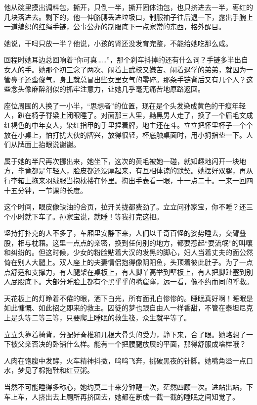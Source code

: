 \documentclass[lang=cn,newtx,12pt,scheme=chinese]{elegantbook}
\begin{document}
他从碗里摸出调料包，撕开，只倒一半，撕开固体油包，也只挤进去一半，枣红的几块落进去。剩下的，他一伸胳膊丢进垃圾口，制服袖子往后退一下，露出手腕上一道编织的红绳手链，公事公办的制服底下一点家常的东西，格外醒目。

她说，干吗只放一半？他说，小孩的肾还没发育完整，不能给她吃那么咸。

回程时她耳边总回响着“你可真……”，那个刹车抖掉的还有什么词？手链多半出自女人的手。她那个初三念了两次、闹着上武校又嫌苦、闹着退学的弟弟，就因为一管鼻子还蛮俊气，身上就总冒出些女里女气的零碎。那条手链背后又有几个人？这些念头像麻醉剂似的抓牢注意力，让她几乎毫无痛苦地原路返回。

座位周围的人换了一小半，“思想者”的位置，现在是个头发染成黄色的干瘦年轻人，趴在椅子脊梁上闭眼睡了。对面那三人里，黝黑男人走了，换了一个眉毛文成红褐色的中年女人，染红指甲的手里捏着牌，地主还在斗。立立把怀里杯子一个个放在小桌上，怕打扰大伙的牌兴，放得很轻，杯底触桌面时，用小拇指垫一下。人们从牌面上抬眼说谢谢。

属于她的半尺再次挪出来，她坐下，这次的黄毛被她一碰，就知趣地闪开一块地方，毕竟都是年轻人，脸皮都还没厚起来，有互相体谅的默契。她摆好双腿，再从行李箱上拖来羽绒服当抱枕搂在怀里。掏出手表看一眼，十一点二十。一来一回四十五分钟，一节课的长度。

这个时间，眼皮像缺油的合页，拉开关拢都费劲了。立立问孙家宝，你不睡？还三个小时就下车了。孙家宝说，就睡！等我打完这把。

坚持打扑克的人不多了，车厢里安静下来，人们以千奇百怪的姿势睡去，交臂叠股，相与枕藉。这里一点点的亲密，换到任何别的地方，都要惹起“耍流氓”的叫嚷和纠纷的。但这时候，少女的粉脸贴着大汉的发黑的脚心，妇人当着丈夫的面公然倚在别人大腿上。双人座上的夫妻情侣抱得像阴阳鱼，头顶着彼此肚子。为了一点点舒适和支撑力，有人腿架在桌板上，有人脚丫高举到壁板上，有人把脚趾塞到别人屁股底下。大部分睡脸上都有个黑乎乎的嘴窟窿，远一看，像不约而同的呼救。

天花板上的灯睁着不倦的眼，洒下白光，所有面孔白惨惨的。睡眠真好啊！睡眠是如此慷慨、如此招之即来的救主。囚徒的梦也跟自由人一样香甜，不管在泰坦尼克上是头等二等三等，只要爬上睡眠的救生筏，众生就平等了。

立立头靠着椅背，分配好脊椎和几根大骨头的受力，静下来，合了眼。她略想了一下被父亲否决的卧铺什么样。能有一个把腰腿放展的平面，那得舒服成啥样哦？

人肉在饱腹中发酵，火车精神抖擞，呜呜飞奔，挑破黑夜的针脚。她嘴角溢一点口水，梦见了棉拖鞋和红豆粥。

当然不可能睡得多称心，她约莫二十来分钟醒一次，茫然四顾一次。进站出站，下车上车，人挤出去上厕所再挤回去，她都在断成一截一截的睡眠之间知觉了。
\end{document}
